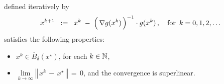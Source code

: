 \begin{theorem}
\begin{enumerate}
	defined iteratively by
	\begin{equation*}
	x^{k+1}
	\;\; := \;\;
		x^{k} \;-\; \left(\,\overset{{\color{white}.}}{\nabla} g(x^{k})\,\right)^{-1}\cdot g(x^{k})\,,
	\quad
	\textnormal{for \,$k = 0, 1, 2, \ldots$}
	\end{equation*}
	satisfies the following properties:
	\begin{itemize}
	\item
		$x^{k} \in \overline{B}_{\delta}(x^{\star})$, for each $k \in \mathbb{N}$,
	\item
		$\underset{k\rightarrow\infty}{\lim} \left\Vert\,x^{k}\,-\,x^{\star}\,\right\Vert \, = \, 0$, and
		the convergence is superlinear.
	\end{itemize}
\end{enumerate}
\end{theorem}
\proof
